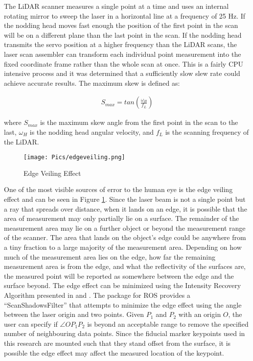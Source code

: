 The LiDAR scanner measures a single point at a time and uses an internal rotating mirror to sweep the laser in a horizontal line at a frequency of 25 Hz. If the nodding head moves fast enough the position of the first point in the scan will be on a different plane than the last point in the scan. If the nodding head transmits the servo position at a higher frequency than the LiDAR scans, the laser scan assembler can transform each individual point measurement into the fixed coordinate frame rather than the whole scan at once. This is a fairly CPU intensive process and it was determined that a sufficiently slow slew rate could achieve accurate results. The maximum skew is defined as:

\begin{align}
    S_{max} = tan\left(\frac{\omega_H}{f_L}\right)
\end{align}

where $S_{max}$ is the maximum skew angle from the first point in the scan to the last, $\omega_H$ is the nodding head angular velocity, and $f_L$ is the scanning frequency of the LiDAR.\\

\begin{figure}
    \centering
    \texttt{[image: Pics/edgeveiling.png]}
    \caption{Edge Veiling Effect}
    \label{fig:veiling}
\end{figure}

One of the most visible sources of error to the human eye is the edge veiling effect and can be seen in Figure \ref{fig:veiling}. Since the laser beam is not a single point but a ray that spreads over distance, when it lands on an edge, it is possible that the area of measurement may only partially lie on a surface. The remainder of the measurement area may lie on a further object or beyond the measurement range of the scanner. The area that lands on the object's edge could be anywhere from a tiny fraction to a large majority of the measurement area. Depending on how much of the measurement area lies on the edge, how far the remaining measurement area is from the edge, and what the reflectivity of the surfaces are, the measured point will be reported as somewhere between the edge and the surface beyond. The edge effect can be minimized using the Intensity Recovery Algorithm presented in \cite{bookbaredge} and \cite{theotherone}. The  package for ROS provides a ``ScanShadowsFilter'' that attempts to minimize the edge effect using the angle between the laser origin and two points. Given $P_1$ and $P_2$ with an origin $O$, the user can specify if $\angle OP_1P_2$ is beyond an acceptable range to remove the specified number of neighbouring data points. Since the fiducial marker keypoints used in this research are mounted such that they stand offset from the surface, it is possible the edge effect may affect the measured location of the keypoint.\\

